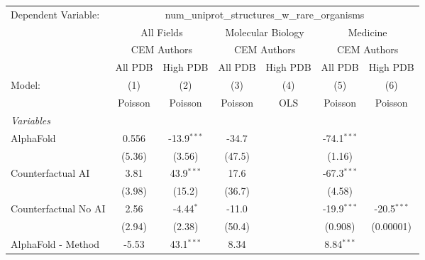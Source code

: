 \begingroup
\centering
\begin{tabular}{lcccccc}
   \tabularnewline \midrule \midrule
   Dependent Variable: & \multicolumn{6}{c}{num\_uniprot\_structures\_w\_rare\_organisms}\\
 & \multicolumn{2}{c}{All Fields} & \multicolumn{2}{c}{Molecular Biology} & \multicolumn{2}{c}{Medicine} \\
\cmidrule(lr){2-3} \cmidrule(lr){4-5} \cmidrule(lr){6-7}
 & \multicolumn{2}{c}{CEM Authors} & \multicolumn{2}{c}{CEM Authors} & \multicolumn{2}{c}{CEM Authors} \\
\cmidrule(lr){2-3} \cmidrule(lr){4-5} \cmidrule(lr){6-7}
 & \multicolumn{1}{c}{All PDB} & \multicolumn{1}{c}{High PDB} & \multicolumn{1}{c}{All PDB} & \multicolumn{1}{c}{High PDB} & \multicolumn{1}{c}{All PDB} & \multicolumn{1}{c}{High PDB} \\
\cmidrule(lr){2-2} \cmidrule(lr){3-3} \cmidrule(lr){4-4} \cmidrule(lr){5-5} \cmidrule(lr){6-6} \cmidrule(lr){7-7}
   Model:                                                     & (1)         & (2)           & (3)     & (4)  & (5)           & (6)\\  
                                                              &  Poisson    & Poisson       & Poisson & OLS  & Poisson       & Poisson\\  
   \midrule
   \emph{Variables}\\
   AlphaFold                                                  & 0.556       & -13.9$^{***}$ & -34.7   &      & -74.1$^{***}$ &   \\   
                                                              & (5.36)      & (3.56)        & (47.5)  &      & (1.16)        &   \\   
   Counterfactual AI                                          & 3.81        & 43.9$^{***}$  & 17.6    &      & -67.3$^{***}$ &   \\   
                                                              & (3.98)      & (15.2)        & (36.7)  &      & (4.58)        &   \\   
   Counterfactual No AI                                       & 2.56        & -4.44$^{*}$   & -11.0   &      & -19.9$^{***}$ & -20.5$^{***}$\\   
                                                              & (2.94)      & (2.38)        & (50.4)  &      & (0.908)       & (0.00001)\\   
   AlphaFold - Method                                         & -5.53       & 43.1$^{***}$  & 8.34    &      & 8.84$^{***}$  &   \\   

\end{tabular}
